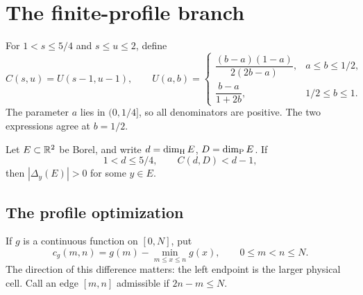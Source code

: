 \clearpage
\section{The finite-profile branch}\label{fprof:section}

For \(1<s\le5/4\) and \(s\le u\le2\), define
\begin{equation}\label{fprof:A}
 C(s,u)=U(s-1,u-1),\qquad
 U(a,b)=\begin{cases}
 \dfrac{(b-a)(1-a)}{2(2b-a)},&a\le b\le1/2,\\[7pt]
 \dfrac{b-a}{1+2b},&1/2\le b\le1.
 \end{cases}
\end{equation}
The parameter \(a\) lies in \((0,1/4]\), so all denominators are positive.
The two expressions agree at \(b=1/2\).

\begin{theorem}\label{fprof:main}
Let \(E\subset\mathbb R^2\) be Borel, and write \(d=\dim_{\mathrm H} E\), \(D=\dim_{\mathrm P} E\). If
\begin{equation}\label{fprof:condition}
 1<d\le5/4,\qquad C(d,D)<d-1,
\end{equation}
then \(|\Delta_y(E)|>0\) for some \(y\in E\).
\end{theorem}

\subsection{The profile optimization}

If \(g\) is a continuous function on \([0,N]\), put
$$
 c_g(m,n)=g(m)-\min_{m\leq x\leq n}g(x),\qquad 0\leq m<n\leq N.
$$
The direction of this difference matters: the left endpoint is the larger physical cell. Call an edge \([m,n]\) admissible if \(2n-m\leq N\).

